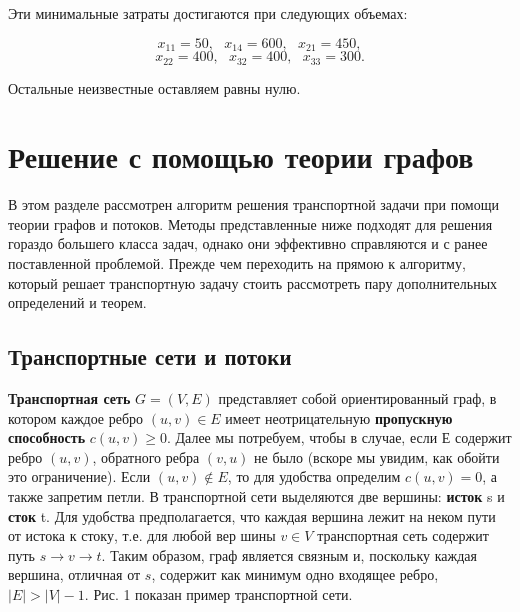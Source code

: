 \documentclass[a4paper,12pt]{article}
\begin{document}
Эти минимальные затраты достигаются при следующих объемах:

\[
	x_{11} = 50, \ \ \ x_{14} = 600, \ \ \ x_{21} = 450,
\]
\[
	x_{22} = 400, \ \ \ x_{32} = 400, \ \ \ x_{33} = 300.
\]

Остальные неизвестные оставляем равны нулю.
\clearpage

\section{Решение с помощью теории графов}

В этом разделе рассмотрен алгоритм решения транспортной задачи при помощи теории графов и потоков. Методы представленные ниже подходят для решения гораздо большего класса задач, однако они эффективно справляются и с ранее поставленной проблемой. Прежде чем переходить на прямою к алгоритму, который решает транспортную задачу стоить рассмотреть пару дополнительных определений и теорем.

\subsection{Транспортные сети и потоки}

\textbf{Транспортная сеть} $G = (V, E)$ представляет собой ориентированный граф, в котором каждое ребро $(u, v) \in E$ имеет неотрицательную \textbf{ пропускную способность} $c(u,v) \geqslant 0$. Далее мы потребуем, чтобы в случае, если $Е$ содержит ребро $(u,v)$, обратного ребра $(v,u)$ не было (вскоре мы	увидим, как обойти это ограничение). Если $(u,v) \notin E$, то для удобства определим $c(u,v) = 0$, а также запретим петли. В транспортной сети выделяются две вершины: \textbf{исток} s и \textbf{сток} t. Для удобства предполагается, что каждая вершина лежит на неком пути от истока к стоку, т.е. для любой вер	шины $v \in V$ транспортная сеть содержит путь $s \longrightarrow v \longrightarrow t$. Таким образом, граф является связным и, поскольку каждая вершина, отличная от $s$, содержит как минимум одно входящее ребро, $|E| > |V| - 1$. Рис. 1 показан пример транспортной сети.
\end{document}
